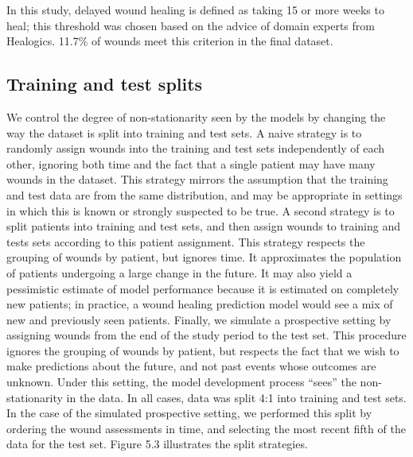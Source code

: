 In this study, delayed wound healing is defined as taking 15 or more
weeks to heal; this threshold was chosen based on the advice of domain
experts from Healogics.  11.7\% of wounds meet this criterion in the
final dataset.

\subsection{Training and test splits}
We control the degree of non-stationarity seen by the models by
changing the way the dataset is split into training and test sets. A
naive strategy is to randomly assign wounds into the training and test
sets independently of each other, ignoring both time and the fact that
a single patient may have many wounds in the dataset.  This strategy
mirrors the assumption that the training and test data are from the
same distribution, and may be appropriate in settings in which this is
known or strongly suspected to be true.  A second strategy is to split
patients into training and test sets, and then assign wounds to
training and tests sets according to this patient assignment.  This
strategy respects the grouping of wounds by patient, but ignores time.
It approximates the population of patients undergoing a large change
in the future.  It may also yield a pessimistic estimate of model
performance because it is estimated on completely new patients; in
practice, a wound healing prediction model would see a mix of new and
previously seen patients.  Finally, we simulate a prospective setting
by assigning wounds from the end of the study period to the test set.
This procedure ignores the grouping of wounds by patient, but respects
the fact that we wish to make predictions about the future, and not
past events whose outcomes are unknown.  Under this setting, the model
development process “sees” the non-stationarity in the data.  In all
cases, data was split 4:1 into training and test sets.  In the case of
the simulated prospective setting, we performed this split by ordering
the wound assessments in time, and selecting the most recent fifth of
the data for the test set.  Figure 5.3 illustrates the split
strategies.

